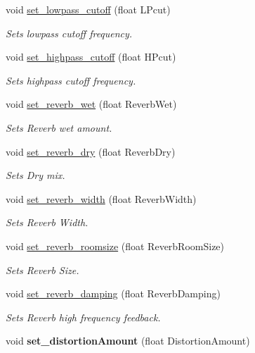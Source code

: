 \begin{DoxyCompactItemize}
\item 
void \hyperlink{class_synth_audio_processor_a17d65bfacbf3a5f3841a2246598be7fc}{set\+\_\+lowpass\+\_\+cutoff} (float L\+Pcut)
\begin{DoxyCompactList}\small\item\em Sets lowpass cutoff frequency. \end{DoxyCompactList}\item 
void \hyperlink{class_synth_audio_processor_ac498d00a3068ab6869092266b99d65ba}{set\+\_\+highpass\+\_\+cutoff} (float H\+Pcut)
\begin{DoxyCompactList}\small\item\em Sets highpass cutoff frequency. \end{DoxyCompactList}\item 
void \hyperlink{class_synth_audio_processor_afb8c6585119247f2c473edf4f6e6e3c5}{set\+\_\+reverb\+\_\+wet} (float Reverb\+Wet)
\begin{DoxyCompactList}\small\item\em Sets Reverb wet amount. \end{DoxyCompactList}\item 
void \hyperlink{class_synth_audio_processor_a4bbfc0a3bd8fc135c984bc2fca283cb6}{set\+\_\+reverb\+\_\+dry} (float Reverb\+Dry)
\begin{DoxyCompactList}\small\item\em Sets Dry mix. \end{DoxyCompactList}\item 
void \hyperlink{class_synth_audio_processor_a1612f768ecad1e5bd590004a60db06d0}{set\+\_\+reverb\+\_\+width} (float Reverb\+Width)
\begin{DoxyCompactList}\small\item\em Sets Reverb Width. \end{DoxyCompactList}\item 
void \hyperlink{class_synth_audio_processor_a1d5b4956b6932d09cba8008c45855eb1}{set\+\_\+reverb\+\_\+roomsize} (float Reverb\+Room\+Size)
\begin{DoxyCompactList}\small\item\em Sets Reverb Size. \end{DoxyCompactList}\item 
void \hyperlink{class_synth_audio_processor_aee77caab3c4062483c19e67847efe075}{set\+\_\+reverb\+\_\+damping} (float Reverb\+Damping)
\begin{DoxyCompactList}\small\item\em Sets Reverb high frequency feedback. \end{DoxyCompactList}\item 
void {\bfseries set\+\_\+distortion\+Amount} (float Distortion\+Amount)\hypertarget{class_synth_audio_processor_af9f13cb9b8c1c94af2d2a56c5bc86259}{}\label{class_synth_audio_processor_af9f13cb9b8c1c94af2d2a56c5bc86259}


\end{DoxyCompactItemize}
